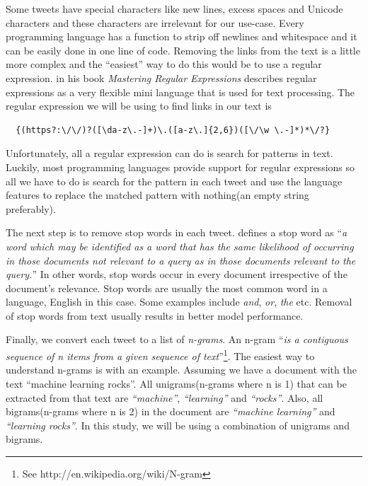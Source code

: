 Some tweets have special characters like new lines, excess spaces and Unicode characters and these
characters are irrelevant for our use-case. Every programming language has a function to strip
off newlines and whitespace and it can be easily done in one line of code. Removing the links from
the text is a little more complex and the ``easiest'' way to do this would be to use a regular
expression. \citet{friedl2006mastering} in his book \textit{Mastering Regular Expressions} describes
regular expressions as a very flexible mini language that is used for text processing. The regular
expression we will be using to find links in our text is
\begin{verbatim}
  {(https?:\/\/)?([\da-z\.-]+)\.([a-z\.]{2,6})([\/\w \.-]*)*\/?}
\end{verbatim}

Unfortunately, all a regular expression can do is search for patterns in text. Luckily, most
programming languages provide support for regular expressions so all we have to do is search for the
pattern in each tweet and use the language features to replace the matched pattern with nothing(an
empty string preferably).

The next step is to remove stop words in each tweet. \citet{wilbur1992automatic} defines a stop word
as ``\textit{a word which may be identified as a word that has the same likelihood of occurring in
those documents not relevant to a query as in those documents relevant to the query.}'' In other
words, stop words occur in every document irrespective of the document's relevance. Stop words are
usually the most common word in a language, English in this case. Some examples include
\textit{and}, \textit{or}, \textit{the} etc. Removal of stop words from text usually results in
better model performance.


Finally, we convert each tweet to a list of \textit{n-grams}. An n-gram ``\textit{is a contiguous
sequence of n items from a given sequence of text}''\footnote{See
http://en.wikipedia.org/wiki/N-gram}. The easiest way to understand n-grams is with an example.
Assuming we have a document with the text ``machine learning rocks''. All unigrams(n-grams
where n is 1) that can be extracted from that text are \textit{``machine''}, \textit{``learning''}
and \textit{``rocks''}. Also, all bigrams(n-grams where n is 2) in the document are
\textit{``machine learning''} and \textit{``learning rocks''}. In this study, we will be using a
combination of unigrams and bigrams.

